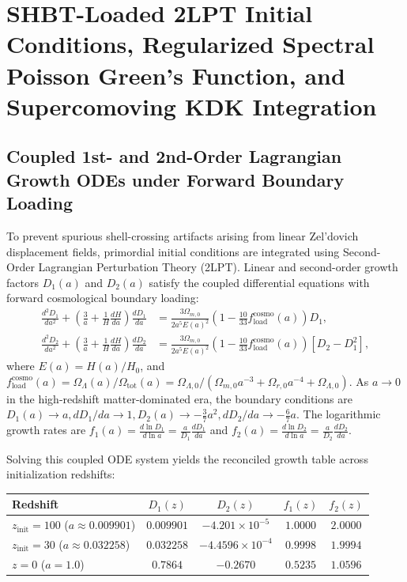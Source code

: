 \documentclass[11pt]{article}
\theoremstyle{plain}
\begin{document}
\section{SHBT-Loaded 2LPT Initial Conditions, Regularized Spectral Poisson Green's Function, and Supercomoving KDK Integration}
\subsection{Coupled 1st- and 2nd-Order Lagrangian Growth ODEs under Forward Boundary Loading}
\label{app:coupled-growth-odes}
\label{app:supercomoving_pm_2lpt}

To prevent spurious shell-crossing artifacts arising from linear Zel'dovich displacement fields, primordial initial conditions are integrated using Second-Order Lagrangian Perturbation Theory (2LPT). Linear and second-order growth factors $D_1(a)$ and $D_2(a)$ satisfy the coupled differential equations with forward cosmological boundary loading:
\begin{align}
    \frac{d^2 D_1}{d a^2} + \left(\frac{3}{a} + \frac{1}{H} \frac{dH}{da}\right)\frac{d D_1}{da} &= \frac{3 \Omega_{m,0}}{2 a^5 E(a)^2}\left(1 - \frac{10}{33} f_{\mathrm{load}}^{\mathrm{cosmo}}(a)\right) D_1, \label{eq:d1_ode_supp} \\
    \frac{d^2 D_2}{d a^2} + \left(\frac{3}{a} + \frac{1}{H} \frac{dH}{da}\right)\frac{d D_2}{da} &= \frac{3 \Omega_{m,0}}{2 a^5 E(a)^2}\left(1 - \frac{10}{33} f_{\mathrm{load}}^{\mathrm{cosmo}}(a)\right) \left[ D_2 - D_1^2 \right], \label{eq:d2_ode_supp}
\end{align}
where $E(a) = H(a)/H_0$, and $f_{\mathrm{load}}^{\mathrm{cosmo}}(a) = \Omega_\Lambda(a)/\Omega_{\mathrm{tot}}(a) = \Omega_{\Lambda,0}/(\Omega_{m,0} a^{-3} + \Omega_{r,0} a^{-4} + \Omega_{\Lambda,0})$. As $a \to 0$ in the high-redshift matter-dominated era, the boundary conditions are $D_1(a) \to a, dD_1/da \to 1, D_2(a) \to -\frac{3}{7}a^2, dD_2/da \to -\frac{6}{7}a$.
The logarithmic growth rates are $f_1(a) = \frac{d\ln D_1}{d\ln a} = \frac{a}{D_1}\frac{dD_1}{da}$ and $f_2(a) = \frac{d\ln D_2}{d\ln a} = \frac{a}{D_2}\frac{dD_2}{da}$.

Solving this coupled ODE system yields the reconciled growth table across initialization redshifts:
\begin{center}
\begin{tabular}{lcccc}
\hline\hline
Redshift & $D_1(z)$ & $D_2(z)$ & $f_1(z)$ & $f_2(z)$ \\
\hline
$z_{\mathrm{init}} = 100$ ($a \approx 0.009901$) & $0.009901$ & $-4.201 \times 10^{-5}$ & $1.0000$ & $2.0000$ \\
$z_{\mathrm{init}} = 30$ ($a \approx 0.032258$) & $0.032258$ & $-4.4596 \times 10^{-4}$ & $0.9998$ & $1.9994$ \\
$z = 0$ ($a = 1.0$) & $0.7864$ & $-0.2670$ & $0.5235$ & $1.0596$ \\
\hline\hline
\end{tabular}
\end{center}
\end{document}
